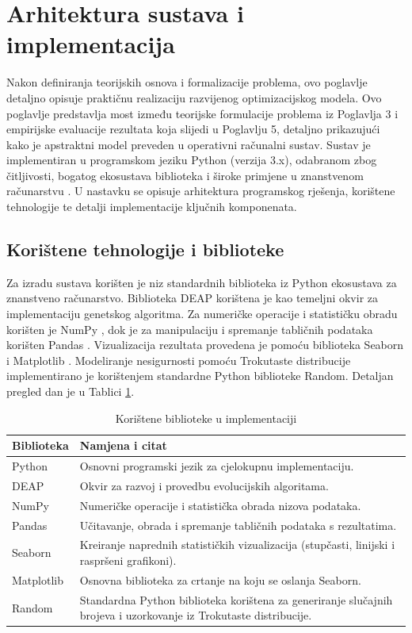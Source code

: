 \section{Arhitektura sustava i implementacija}
\label{chap:implementacija}

Nakon definiranja teorijskih osnova i formalizacije problema, ovo poglavlje detaljno opisuje praktičnu realizaciju razvijenog optimizacijskog modela. Ovo poglavlje predstavlja most između teorijske formulacije problema iz Poglavlja 3 i empirijske evaluacije rezultata koja slijedi u Poglavlju 5, detaljno prikazujući kako je apstraktni model preveden u operativni računalni sustav. Sustav je implementiran u programskom jeziku Python (verzija 3.x), odabranom zbog čitljivosti, bogatog ekosustava biblioteka i široke primjene u znanstvenom računarstvu \cite{PythonSoftwareFoundation}. U nastavku se opisuje arhitektura programskog rješenja, korištene tehnologije te detalji implementacije ključnih komponenata.
\subsection{Korištene tehnologije i biblioteke}
Za izradu sustava korišten je niz standardnih biblioteka iz Python ekosustava za znanstveno računarstvo. Biblioteka DEAP \cite{DEAP2012} korištena je kao temeljni okvir za implementaciju genetskog algoritma. Za numeričke operacije i statističku obradu korišten je NumPy \cite{Harris2020}, dok je za manipulaciju i spremanje tabličnih podataka korišten Pandas \cite{PandasDevelopmentTeam2020}. Vizualizacija rezultata provedena je pomoću biblioteka Seaborn \cite{Waskom2021} i Matplotlib \cite{Hunter2007}. Modeliranje nesigurnosti pomoću Trokutaste distribucije implementirano je korištenjem standardne Python biblioteke Random. Detaljan pregled dan je u Tablici \ref{tab:biblioteke}.
\begin{table}[H]
\centering
\caption{Korištene biblioteke u implementaciji}
\label{tab:biblioteke}
\begin{tabular}{|l|p{10cm}|}
\hline
\textbf{Biblioteka} & \textbf{Namjena i citat} \\ \hline
Python & Osnovni programski jezik za cjelokupnu implementaciju. \cite{PythonSoftwareFoundation} \\ \hline
DEAP & Okvir za razvoj i provedbu evolucijskih algoritama. \cite{DEAP2012} \\ \hline
NumPy & Numeričke operacije i statistička obrada nizova podataka. \cite{Harris2020} \\ \hline
Pandas & Učitavanje, obrada i spremanje tabličnih podataka s rezultatima. \cite{PandasDevelopmentTeam2020} \\ \hline
Seaborn & Kreiranje naprednih statističkih vizualizacija (stupčasti, linijski i raspršeni grafikoni). \cite{Waskom2021} \\ \hline
Matplotlib & Osnovna biblioteka za crtanje na koju se oslanja Seaborn. \cite{Hunter2007} \\ \hline
Random & Standardna Python biblioteka korištena za generiranje slučajnih brojeva i uzorkovanje iz Trokutaste distribucije. \\ \hline
\end{tabular}
\end{table}

